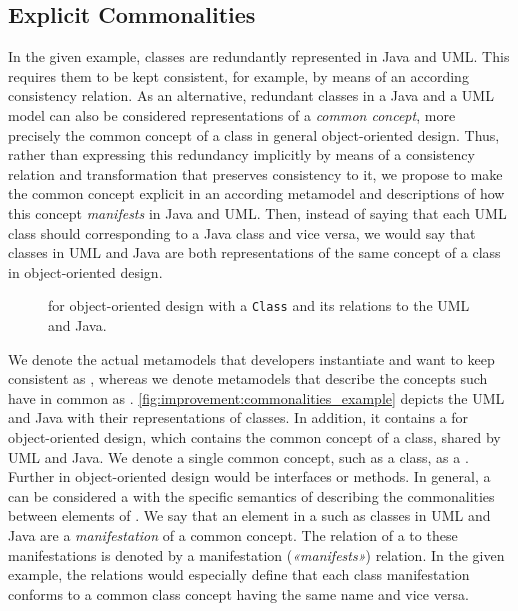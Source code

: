\subsection{Explicit Commonalities}

In the given example, classes are redundantly represented in Java and \gls{UML}.
This requires them to be kept consistent, for example, by means of an according consistency relation.
As an alternative, redundant classes in a Java and a \gls{UML} model can also be considered representations of a \emph{common concept}, more precisely the common concept of a class in general object-oriented design.
Thus, rather than expressing this redundancy implicitly by means of a consistency relation and transformation that preserves consistency to it, we propose to make the common concept explicit in an according metamodel and descriptions of how this concept \emph{manifests} in Java and \gls{UML}.
Then, instead of saying that each \gls{UML} class should corresponding to a Java class and vice versa, we would say that classes in \gls{UML} and Java are both representations of the same concept of a class in object-oriented design.

\begin{figure}
    \centering
    
    \caption[Concept metamodel for object-oriented design]{\Conceptmetamodel for object-oriented design with a \texttt{Class} \commonality and its relations to the \concretemetamodels \gls{UML} and Java.}
    \label{fig:improvement:commonalities_example}
\end{figure}

We denote the actual metamodels that developers instantiate and want to keep consistent as \emph{\concretemetamodels}, whereas we denote metamodels that describe the concepts such \concretemetamodels have in common as \emph{\conceptmetamodels}.
\autoref{fig:improvement:commonalities_example} depicts the \concretemetamodels \gls{UML} and Java with their representations of classes.
In addition, it contains a \conceptmetamodel for object-oriented design, which contains the common concept of a class, shared by \gls{UML} and Java.
We denote a single common concept, such as a class, as a \emph{\commonality}.
Further \commonalities in object-oriented design would be interfaces or methods.
In general, a \commonality can be considered a \metaclass with the specific semantics of describing the commonalities between elements of \concretemetamodels.
We say that an element in a \concretemetamodel such as classes in \gls{UML} and Java are a \emph{manifestation} of a common concept.
The relation of a \commonality to these manifestations is denoted by a manifestation (\emph{«manifests»}) relation.
In the given example, the relations would especially define that each class manifestation conforms to a common class concept having the same name and vice versa.

